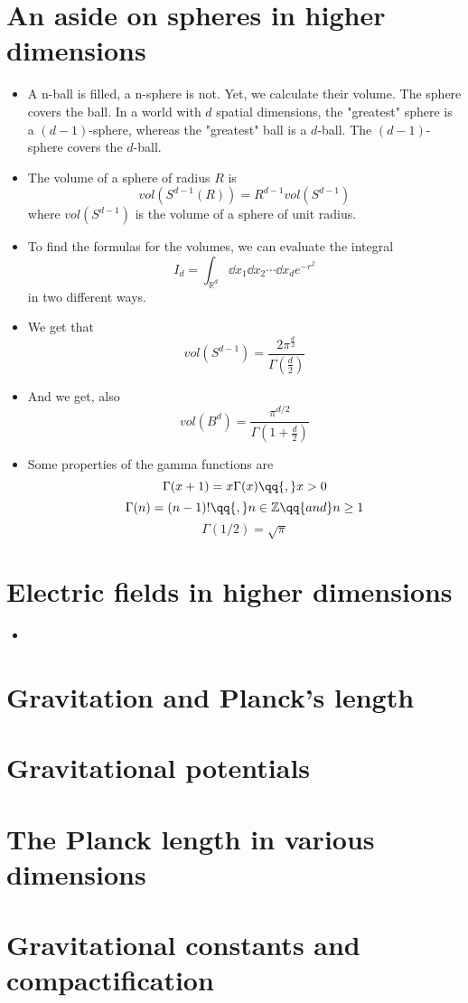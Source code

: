 \documentclass[12pt]{report}
\begin{document}
\section{An aside on spheres in higher dimensions}
\begin{itemize}
    \item A n-ball is filled, a n-sphere is not. Yet, we calculate their volume. The sphere covers the ball. In a world with $d$ spatial dimensions, the "greatest" sphere is a $(d-1)$-sphere, whereas the "greatest" ball is a $d$-ball. The $(d-1)$-sphere covers the $d$-ball.
    \item The volume of a sphere of radius $R$ is 
    $$vol(S^{d-1}(R)) = R^{d-1}vol(S^{d-1})$$
    where $vol(S^{d-1})$ is the volume of a sphere of unit radius.
    \item To find the formulas for the volumes, we can evaluate the integral
    $$I_d = \int_ {\mathbb{R}^d} \dd{x_{1}} \dd{x_{2}} \cdots \dd{x_{d}} e^{-r^2}$$
    in two different ways.
    \item We get that 
    $$vol(S^{d-1}) = \frac{2\pi^{\frac{d}{2}}}{\Gamma (\frac{d}{2})}$$
    \item And we get, also
    $$vol(B^d) = \frac{\pi^{d/2}}{\Gamma(1 + \frac{d}{2})}$$
    \item Some properties of the gamma functions are
    $$\Gamma (x+1)=x\Gamma(x) \qq{, } x>0 $$
    $$\Gamma (n) = (n-1)!\qq{, } n \in \mathbb{Z}\qq{and}n\geq1$$
    $$\Gamma(1/2) = \sqrt{\pi}$$
\end{itemize}
\section{Electric fields in higher dimensions}
\begin{itemize}
    \item 
\end{itemize}
\section{Gravitation and Planck's length}
\section{Gravitational potentials}
\section{The Planck length in various dimensions}
\section{Gravitational constants and compactification}
\end{document}
